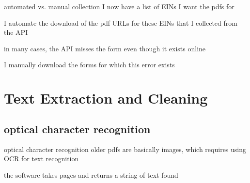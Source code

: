 \documentclass[notes,11pt, aspectratio=169]{beamer}
\newenvironment{wideitemize}{\itemize\addtolength{\itemsep}{10pt}}{\enditemize}
\begin{document}
\begin{frame}{automated vs. manual collection}
    I now have a list of EINs I want the pdfs for

    \vspace{4mm}

    \begin{wideitemize}
        \item I automate the download of the pdf URLs for these EINs that I collected from the API
        \item in many cases, the API misses the form even though it exists online
        \item I manually download the forms for which this error exists
    \end{wideitemize}
\end{frame}


\section{Text Extraction and Cleaning}

\subsection{optical character recognition}

\begin{frame}{optical character recognition}
    older pdfs are basically images, which requires using OCR for text recognition

    \vspace{4mm}

    \begin{wideitemize}
        \item the software takes pages and returns a string of text found
    \end{wideitemize}
\end{frame}
\end{document}
